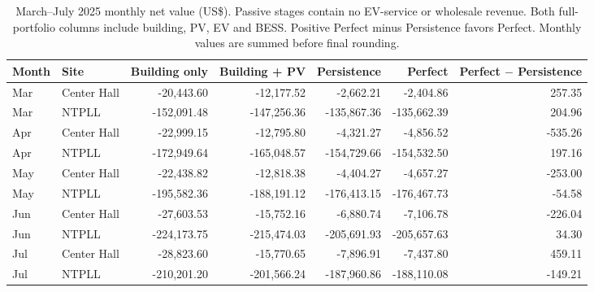 \documentclass[final,5p,times]{elsarticle}
\begin{document}
\begin{table}[!t]
\centering
\caption{March--July 2025 monthly net value (US\$). Passive stages contain no EV-service or wholesale revenue. Both full-portfolio columns include building, PV, EV and BESS. Positive Perfect minus Persistence favors Perfect. Monthly values are summed before final rounding.}
\label{tab:site_monthly_results}
\scriptsize
\setlength{\tabcolsep}{5pt}
\begin{tabular}{@{}llrrrrr@{}}
\toprule
Month & Site & Building only & Building + PV & Persistence & Perfect & Perfect $-$ Persistence\\
\midrule
Mar & Center Hall & -20,443.60 & -12,177.52 & -2,662.21 & -2,404.86 & 257.35 \\
Mar & NTPLL & -152,091.48 & -147,256.36 & -135,867.36 & -135,662.39 & 204.96 \\
Apr & Center Hall & -22,999.15 & -12,795.80 & -4,321.27 & -4,856.52 & -535.26 \\
Apr & NTPLL & -172,949.64 & -165,048.57 & -154,729.66 & -154,532.50 & 197.16 \\
May & Center Hall & -22,438.82 & -12,818.38 & -4,404.27 & -4,657.27 & -253.00 \\
May & NTPLL & -195,582.36 & -188,191.12 & -176,413.15 & -176,467.73 & -54.58 \\
Jun & Center Hall & -27,603.53 & -15,752.16 & -6,880.74 & -7,106.78 & -226.04 \\
Jun & NTPLL & -224,173.75 & -215,474.03 & -205,691.93 & -205,657.63 & 34.30 \\
Jul & Center Hall & -28,823.60 & -15,770.65 & -7,896.91 & -7,437.80 & 459.11 \\
Jul & NTPLL & -210,201.20 & -201,566.24 & -187,960.86 & -188,110.08 & -149.21 \\
\bottomrule
\end{tabular}
\end{table}
\end{document}
